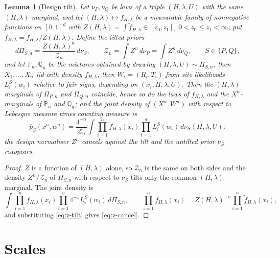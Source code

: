 \documentclass[11pt]{article}
\newtheorem{lemma}[lemma]{Lemma}
\newcommand{\PP}{\mathbb{P}}
\begin{document}
\begin{lemma}[Design tilt]\label{lem:tilt}
Let \(\nu_P,\nu_Q\) be laws of a triple \((H,\lambda,U)\) with the same
\((H,\lambda)\)-marginal, and let \((H,\lambda)\mapsto\widetilde f_{H,\lambda}\)
be a measurable family of nonnegative functions on \([0,1]^d\) with
\(Z(H,\lambda)=\int\widetilde f_{H,\lambda}\in[z_0,z_1]\), \(0<z_0\le z_1<\infty\);
put \(f_{H,\lambda}=\widetilde f_{H,\lambda}/Z(H,\lambda)\).  Define the tilted
priors
\begin{equation}
 d\Pi_{S,n}=\frac{Z(H,\lambda)^n}{\mathcal Z_n}\,d\nu_S,\qquad
 \mathcal Z_n=\int Z^n\,d\nu_P=\int Z^n\,d\nu_Q,\qquad S\in\{P,Q\},
 \label{eq:z-tilt}
\end{equation}
and let \(\PP_n,\mathbb Q_n\) be the mixtures obtained by drawing
\((H,\lambda,U)\sim\Pi_{S,n}\), then \(X_1,\dots,X_n\) iid with density
\(f_{H,\lambda}\), then \(W_i=(R_i,T_i)\) from site likelihoods
\(L^S_i(w_i)\) relative to fair signs, depending on \((x_i,H,\lambda,U)\).
Then the \((H,\lambda)\)-marginals of \(\Pi_{P,n}\) and \(\Pi_{Q,n}\)
coincide, hence so do the laws of \(f_{H,\lambda}\) and the
\(X^n\)-marginals of \(\PP_n\) and \(\mathbb Q_n\); and the joint density of
\((X^n,W^n)\) with respect to Lebesgue measure times counting measure is
\begin{equation}
 \overline p_S(x^n,w^n)=\frac{4^{-n}}{\mathcal Z_n}\int\prod_{i=1}^n\widetilde f_{H,\lambda}(x_i)\prod_{i=1}^nL^S_i(w_i)\,d\nu_S(H,\lambda,U):
 \label{eq:z-cancel}
\end{equation}
the design normaliser \(Z^n\) cancels against the tilt and the untilted
prior \(\nu_S\) reappears.
\end{lemma}
\begin{proof}
\(Z\) is a function of \((H,\lambda)\) alone, so \(\mathcal Z_n\) is the same
on both sides and the density \(Z^n/\mathcal Z_n\) of \(\Pi_{S,n}\) with
respect to \(\nu_S\) tilts only the common \((H,\lambda)\)-marginal.  The
joint density is
\[
 \int\prod_{i=1}^nf_{H,\lambda}(x_i)\prod_{i=1}^n4^{-1}L^S_i(w_i)\,d\Pi_{S,n},
 \qquad
 \prod_{i=1}^nf_{H,\lambda}(x_i)=Z(H,\lambda)^{-n}\prod_{i=1}^n\widetilde f_{H,\lambda}(x_i),
\]
and substituting \eqref{eq:z-tilt} gives \eqref{eq:z-cancel}.
\end{proof}

\section{Scales}\label{sec:scales}
\end{document}
